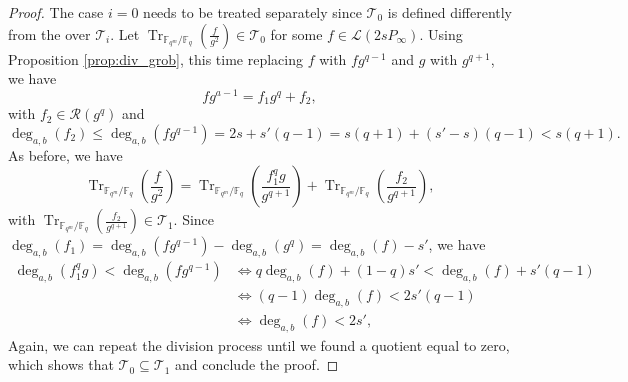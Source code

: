 \documentclass[a4paper]{article}
\theoremstyle{definition}
\theoremstyle{remark}
\newcommand{\calL}{\mathcal{L}}
\newcommand{\calR}{\mathcal{R}}
\newcommand{\calT}{\mathcal{T}}
\newcommand{\fq}{\mathbb{F}_{q}}
\newcommand{\Tr}[1]{\operatorname{Tr}_{\mathbb{F}_{q^m}/\fq}\left(#1\right)}
\newcommand{\degab}[1]{\deg_{a,b}\left(#1\right)}
\begin{document}
\begin{proof}
The case $i=0$ needs to be treated separately since $\calT_0$ is defined differently from the over $\calT_i$. Let $\Tr{\frac{f}{g^2}} \in \calT_0$ for some $f \in \calL(2sP_\infty)$. Using Proposition \ref{prop:div_grob}, this time replacing $f$ with $fg^{q-1}$ and $g$ with $g^{q+1}$, we have
$$fg^{a-1} = f_1g^q + f_2,$$ with $f_2 \in \calR(g^q)$ and 
$$\degab{f_2} \leq \degab{fg^{q-1}} = 2s + s'(q-1) = s(q+1) + (s'-s)(q-1) < s(q+1).$$
As before, we have 
    $$ \Tr{\frac{f}{g^2}} = \Tr{\frac{f_1^qg}{g^{q+1}}}  + \Tr{\frac{f_2}{g^{q+1}}}, $$
with $\Tr{\frac{f_2}{g^{q+1}}} \in \calT_1$. Since $\degab{f_1} = \degab{fg^{q-1}} - \degab{g^q} = \degab{f}-s'$, we have 
\begin{align*}
     \degab{f_1^qg} < \degab{fg^{q-1}} & \iff q\degab{f} +(1-q)s' < \degab{f} + s'(q-1)\\
                                               & \iff (q-1)\degab{f} < 2s'(q-1)\\
                                               & \iff \degab{f} < 2s',
\end{align*}
Again, we can repeat the division process until we found a quotient equal to zero, which shows that $\calT_0 \subseteq \calT_1$ and conclude the proof.
\end{proof}
\color{black}
\end{document}

